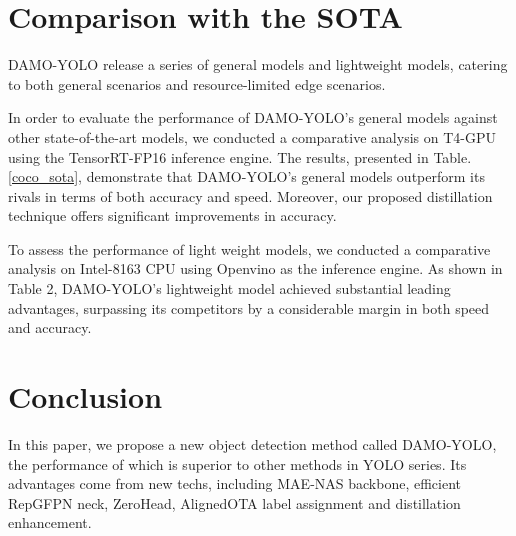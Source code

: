 \documentclass[10pt,twocolumn,letterpaper]{article}
\begin{document}
\section{Comparison with the SOTA}


DAMO-YOLO release a series of general models and lightweight models, catering to both general scenarios and resource-limited edge scenarios. 

In order to evaluate the performance of DAMO-YOLO's general models against other state-of-the-art models, we conducted a comparative analysis on T4-GPU using the TensorRT-FP16 inference engine. The results, presented in Table.\ref{coco_sota}, demonstrate that DAMO-YOLO's general models outperform its rivals in terms of both accuracy and speed. Moreover, our proposed distillation technique offers significant improvements in accuracy. 

To assess the performance of light weight models, we conducted a comparative analysis on Intel-8163 CPU using Openvino as the inference engine. As shown in Table 2, DAMO-YOLO's lightweight model achieved substantial leading advantages, surpassing its competitors by a considerable margin in both speed and accuracy.


\section{Conclusion}
In this paper, we propose a new object detection method called DAMO-YOLO, the performance of which is superior to other methods in YOLO series. Its advantages come from new techs, including MAE-NAS backbone, efficient RepGFPN neck, ZeroHead, AlignedOTA label assignment and distillation enhancement.
{\small


}
\end{document}

